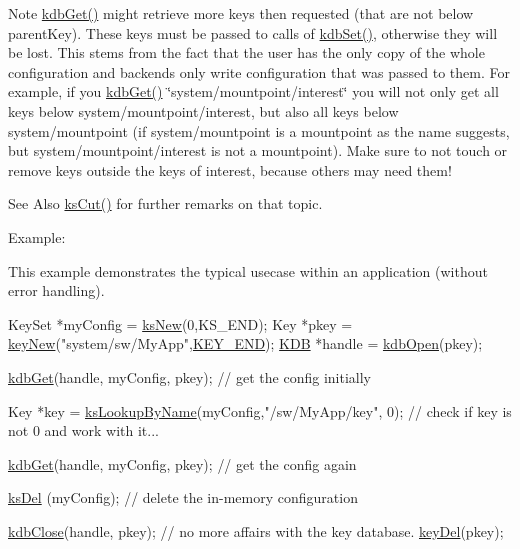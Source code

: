 \begin{DoxyNote}{Note}
\hyperlink{group__kdb_ga28e385fd9cb7ccfe0b2f1ed2f62453a1}{kdb\-Get()} might retrieve more keys then requested (that are not below parent\-Key). These keys must be passed to calls of \hyperlink{group__kdb_ga11436b058408f83d303ca5e996832bcf}{kdb\-Set()}, otherwise they will be lost. This stems from the fact that the user has the only copy of the whole configuration and backends only write configuration that was passed to them. For example, if you \hyperlink{group__kdb_ga28e385fd9cb7ccfe0b2f1ed2f62453a1}{kdb\-Get()} \char`\"{}system/mountpoint/interest\char`\"{} you will not only get all keys below system/mountpoint/interest, but also all keys below system/mountpoint (if system/mountpoint is a mountpoint as the name suggests, but system/mountpoint/interest is not a mountpoint). Make sure to not touch or remove keys outside the keys of interest, because others may need them!
\end{DoxyNote}
\begin{DoxySeeAlso}{See Also}
\hyperlink{group__keyset_ga6b00cf82b59af4d883a9bad6cf4a4a4a}{ks\-Cut()} for further remarks on that topic.
\end{DoxySeeAlso}
\begin{DoxyParagraph}{Example\-:}

\end{DoxyParagraph}
This example demonstrates the typical usecase within an application (without error handling).


\begin{DoxyCode}
KeySet *myConfig = \hyperlink{group__keyset_ga671e1aaee3ae9dc13b4834a4ddbd2c3c}{ksNew}(0,KS\_END);
Key *pkey = \hyperlink{group__key_gad23c65b44bf48d773759e1f9a4d43b89}{keyNew}(\textcolor{stringliteral}{"system/sw/MyApp"},\hyperlink{group__key_gga91fb3178848bd682000958089abbaf40aa8adb6fcb92dec58fb19410eacfdd403}{KEY\_END});
\hyperlink{classkdb_1_1KDB_a7e0637995ce9f294cdbc6f167df6db40}{KDB} *handle = \hyperlink{group__kdb_ga6808defe5870f328dd17910aacbdc6ca}{kdbOpen}(pkey);

\hyperlink{group__kdb_ga28e385fd9cb7ccfe0b2f1ed2f62453a1}{kdbGet}(handle, myConfig, pkey); \textcolor{comment}{// get the config initially}

Key *key = \hyperlink{group__keyset_gad2e30fb6d4739d917c5abb2ac2f9c1a1}{ksLookupByName}(myConfig,\textcolor{stringliteral}{"/sw/MyApp/key"}, 0);
\textcolor{comment}{// check if key is not 0 and work with it...}

\hyperlink{group__kdb_ga28e385fd9cb7ccfe0b2f1ed2f62453a1}{kdbGet}(handle, myConfig, pkey); \textcolor{comment}{// get the config again}

\hyperlink{group__keyset_ga27e5c16473b02a422238c8d970db7ac8}{ksDel} (myConfig); \textcolor{comment}{// delete the in-memory configuration}

\hyperlink{group__kdb_gadb54dc9fda17ee07deb9444df745c96f}{kdbClose}(handle, pkey); \textcolor{comment}{// no more affairs with the key database.}
\hyperlink{group__key_ga3df95bbc2494e3e6703ece5639be5bb1}{keyDel}(pkey);
\end{DoxyCode}


